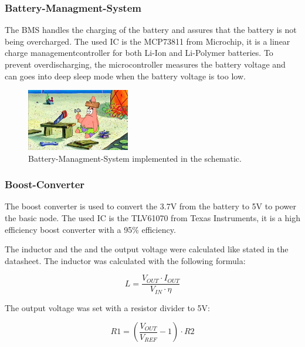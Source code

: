     \subsubsection{Battery-Managment-System}

        The BMS handles the charging of the battery and assures that the battery is not
        being overcharged. The used IC is the MCP73811 from Microchip, it is a linear 
        charge managementcontroller for both Li-Ion and Li-Polymer batteries. 
        To prevent overdischarging, the microcontroller measures the battery voltage
        and can goes into deep sleep mode when the battery voltage is too low.

        \begin{figure}[H]
        \centering
        \includegraphics[width=0.4\textwidth]{assets/HW/TBD.png}
        \caption{Battery-Managment-System implemented in the schematic.}
        \end{figure}

    \subsubsection{Boost-Converter}

        The boost converter is used to convert the 3.7V from the battery to 5V to power the 
        basic node. The used IC is the TLV61070 from Texas Instruments, it is a high efficiency
        boost converter with a 95\% efficiency.

        The inductor and the and the output voltage were calculated like stated in the
        datasheet\cite{noauthor_tlv61070apdf_2022}. The inductor was calculated with the following formula:
        
        \begin{equation}
            L = \frac{V_{OUT} \cdot I_{OUT}}{V_{IN} \cdot \eta}
        \end{equation}  

        The output voltage was set with a resistor divider to 5V:

        \begin{equation}
            R1 = ( \frac{V_{OUT}}{V_{REF}} - 1) \cdot R2
        \end{equation}

